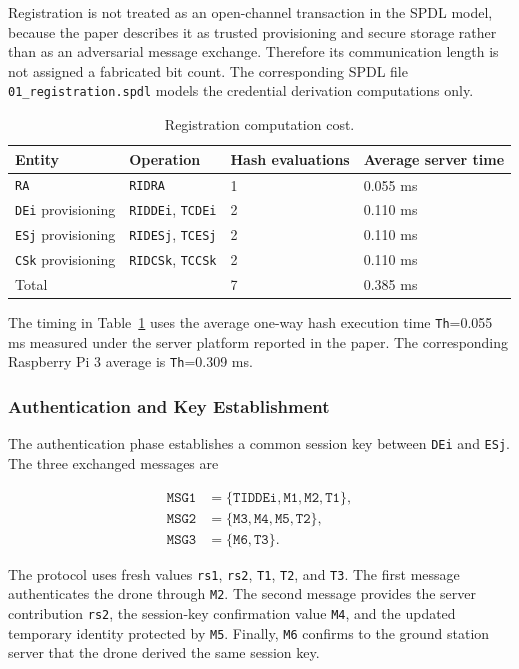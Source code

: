 Registration is not treated as an open-channel transaction in the SPDL model,
because the paper describes it as trusted provisioning and secure storage rather
than as an adversarial message exchange. Therefore its communication length is
not assigned a fabricated bit count. The corresponding SPDL file
\texttt{01\_registration.spdl} models the credential derivation computations only.

\begin{table}[ht]
\centering
\caption{Registration computation cost.}
\label{tab:bakmm-registration-cost}
\begin{tabular}{llll}
\toprule
Entity & Operation & Hash evaluations & Average server time \\
\midrule
\texttt{RA} & \texttt{RIDRA} & 1 & 0.055 ms \\
\texttt{DEi} provisioning & \texttt{RIDDEi}, \texttt{TCDEi} & 2 & 0.110 ms \\
\texttt{ESj} provisioning & \texttt{RIDESj}, \texttt{TCESj} & 2 & 0.110 ms \\
\texttt{CSk} provisioning & \texttt{RIDCSk}, \texttt{TCCSk} & 2 & 0.110 ms \\
\midrule
Total & & 7 & 0.385 ms \\
\bottomrule
\end{tabular}
\end{table}

The timing in Table~\ref{tab:bakmm-registration-cost} uses the average one-way
hash execution time \texttt{Th}=0.055 ms measured under the server platform
reported in the paper. The corresponding Raspberry Pi 3 average is
\texttt{Th}=0.309 ms.

\subsubsection{Authentication and Key Establishment}

The authentication phase establishes a common session key between \texttt{DEi} and
\texttt{ESj}. The three exchanged messages are

\begin{align}
\texttt{MSG1} &= \{\texttt{TIDDEi},\texttt{M1},\texttt{M2},\texttt{T1}\},\\
\texttt{MSG2} &= \{\texttt{M3},\texttt{M4},\texttt{M5},\texttt{T2}\},\\
\texttt{MSG3} &= \{\texttt{M6},\texttt{T3}\}.
\end{align}

The protocol uses fresh values \texttt{rs1}, \texttt{rs2}, \texttt{T1},
\texttt{T2}, and \texttt{T3}. The first message authenticates the drone through
\texttt{M2}. The second message provides the server contribution \texttt{rs2},
the session-key confirmation value \texttt{M4}, and the updated temporary
identity protected by \texttt{M5}. Finally, \texttt{M6} confirms to the ground
station server that the drone derived the same session key.

